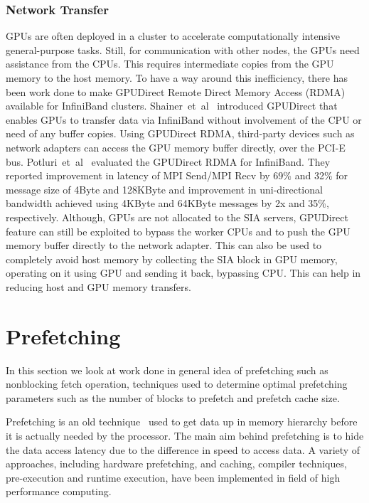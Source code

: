 \subsubsection{Network Transfer}
GPUs are often deployed in a cluster to accelerate computationally intensive
general-purpose tasks. Still, for communication with other nodes, the GPUs need assistance from the CPUs.
This requires intermediate copies from the GPU memory to the host memory. To have
a way around this inefficiency, there has been work done to make GPUDirect Remote
Direct Memory Access (RDMA) available for InfiniBand clusters. Shainer~et~al~\cite{Shainer2011} introduced
GPUDirect that enables GPUs to transfer data via InfiniBand without involvement
of the CPU or need of any buffer copies. Using GPUDirect RDMA, third-party devices such as
network adapters can access the GPU memory buffer directly, over the PCI-E bus.
Potluri~et~al~\cite{Potluri:2013:EIM:2570457.2571010} evaluated the GPUDirect RDMA for InfiniBand. They reported
improvement in latency of MPI Send/MPI Recv by 69\% and 32\% for message size of
4Byte and 128KByte and improvement in uni-directional bandwidth achieved using
4KByte and 64KByte messages by 2x and 35\%, respectively.
Although, GPUs are not allocated to the SIA servers, GPUDirect feature can still
be exploited to bypass the worker CPUs and to push the GPU memory buffer directly to the network
adapter. This can also be used to completely avoid host memory by collecting the
SIA block in GPU memory, operating on it using GPU and sending it back, bypassing
CPU. This can help in reducing host and GPU memory transfers.

\section{Prefetching}
In this section we look at work done in general idea of prefetching such as
nonblocking fetch operation, techniques used to determine optimal prefetching
parameters such as the number of blocks to prefetch and prefetch cache size.

Prefetching is an old technique~\cite{anacker68, Smith1982, Vanderwiel2000}
used to get data up in memory hierarchy before it is actually needed by the processor.
The main aim behind prefetching is to hide the data access latency due to the difference in speed to access
data. A variety of approaches, including hardware prefetching, and caching, compiler
techniques, pre-execution and runtime execution, have been implemented in field of
high performance computing.

